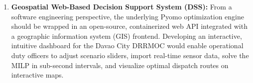 \begin{enumerate}
    \item \textbf{Geospatial Web-Based Decision Support System (DSS):}
    From a software engineering perspective, the underlying Pyomo optimization engine should be wrapped in an open-source, containerized web API integrated with a geographic information system (GIS) frontend. Developing an interactive, intuitive dashboard for the Davao City DRRMOC would enable operational duty officers to adjust scenario sliders, import real-time sensor data, solve the MILP in sub-second intervals, and visualize optimal dispatch routes on interactive maps.
\end{enumerate}
